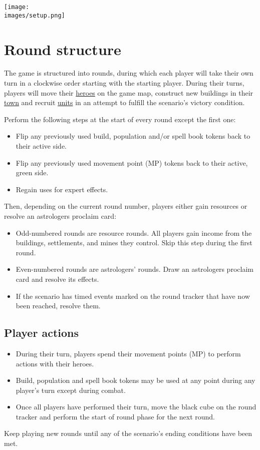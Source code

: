 \documentclass[12pt]{article}
\def\assets{assets}
\def\images{\assets/images}
\begin{document}
\clearpage

\begin{center}
\texttt{[image: \\images/setup.png]}
\end{center}

\clearpage

\section{Round structure}
The game is structured into rounds, during which each player will take their own turn in a clockwise order starting with the starting player. During their turns, players will move their \hyperlink{Heroes}{heroes} on the game map, construct new buildings in their \hyperlink{Town}{town} and recruit \hyperlink{Units}{units} in an attempt to fulfill the scenario’s victory condition.\par
Perform the following steps at the start of every round except the first one:
\begin{itemize}
\item Flip any previously used build, population and/or spell book tokens back to their active side.
\item Flip any previously used movement point (MP) tokens back to their active, green side.
\item Regain uses for expert effects.
\end{itemize}
Then, depending on the current round number, players either gain resources or resolve an astrologers proclaim card:
\begin{itemize}
\item Odd-numbered rounds are resource rounds. All players gain income from the buildings, settlements, and mines they control. Skip this step during the first round.
\item Even-numbered rounds are astrologers’ rounds. Draw an astrologers proclaim card and resolve its effects.
\item If the scenario has timed events marked on the round tracker that have now been reached, resolve them.
\end{itemize}
\subsection*{Player actions}
\begin{itemize}
\item During their turn, players spend their movement points (MP) to perform actions with their heroes.
\item Build, population and spell book tokens may be used at any point during any player’s turn except during combat.
\item Once all players have performed their turn, move the black cube on the round tracker and perform the start of round phase for the next round.
\end{itemize}
Keep playing new rounds until any of the scenario’s ending conditions have been met.
\end{document}
